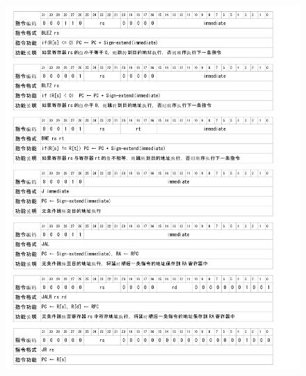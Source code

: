     \begin{figure}[!hbp]
            \centering
            \includegraphics[width=\textwidth]{chart/insert3.jpg}
    \end{figure}

